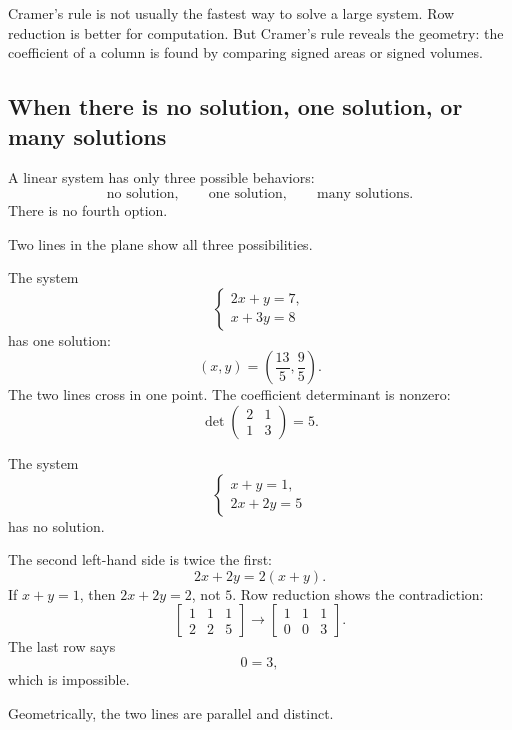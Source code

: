 Cramer's rule is not usually the fastest way to solve a large system.  Row reduction is
better for computation.  But Cramer's rule reveals the geometry: the coefficient of a
column is found by comparing signed areas or signed volumes.

\subsection{When there is no solution, one solution, or many solutions}

A linear system has only three possible behaviors:
\[
    \text{no solution},\qquad
    \text{one solution},\qquad
    \text{many solutions}.
\]
There is no fourth option.

Two lines in the plane show all three possibilities.

\begin{example}
The system
\[
\begin{cases}
2x+y=7,\\
x+3y=8
\end{cases}
\]
has one solution:
\[
    (x,y)=\left(\frac{13}{5},\frac95\right).
\]
The two lines cross in one point.  The coefficient determinant is nonzero:
\[
    \det
    \begin{pmatrix}
        2&1\\
        1&3
    \end{pmatrix}
    =
    5.
\]
\end{example}

\begin{example}[No solution]
The system
\[
\begin{cases}
x+y=1,\\
2x+2y=5
\end{cases}
\]
has no solution.

The second left-hand side is twice the first:
\[
    2x+2y=2(x+y).
\]
If \(x+y=1\), then \(2x+2y=2\), not \(5\).  Row reduction shows the contradiction:
\[
\left[
\begin{array}{cc|c}
1&1&1\\
2&2&5
\end{array}
\right]
\longrightarrow
\left[
\begin{array}{cc|c}
1&1&1\\
0&0&3
\end{array}
\right].
\]
The last row says
\[
    0=3,
\]
which is impossible.

Geometrically, the two lines are parallel and distinct.
\end{example}

